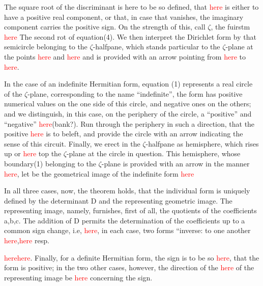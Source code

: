 The square root of the discriminant is here to be so defined, that \textcolor{red}{here} is either to have a positive real component, or that, in case that vanishes, the imaginary component carries the positive sign. On the strength of this, call $\zeta$, the fuirstm \textcolor{red}{here} The second rot of equation(4). We then interpret the Dirichlet form by that semicircle belonging to the $\zeta$-halfpane, which stands particular to the $\zeta$-plane at the points \textcolor{red}{here} and \textcolor{red}{here} and is provided with an arrow pointing from \textcolor{red}{here} to \textcolor{red}{here}.

In the case of an indefinite Hermitian form, equation (1) represents a real circle of the $\zeta$-plane, corresponding to the name “indefinite”, the form has positive numerical values on the one side of this circle, and negative ones on the others; and we distinguish, in this case, on the periphery of the circle, a “positive” and “negative” \textcolor{red}{here}(bank?). Run through the periphery in such a direction, that the positive \textcolor{red}{here} is to beleft, and provide the circle with an arrow indicating the sense of this circuit. Finally, we erect in the $\zeta$-halfpane as hemisphere, which rises up or \textcolor{red}{here} top the $\zeta$-plane at the circle in question. This hemisphere, whose boundary(1) belonging to the $\zeta$-plane is provided with an arrow in the manner \textcolor{red}{here}, let be the geometrical image of the indefinite form \textcolor{red}{here}

In all three cases, now, the theorem holds, that the individual form is uniquely defined by the determinant D and the representing geometric image. The representing image, namely, furnishes, first of all, the quotients of the coefficients a,b,c. The addition of D permits the determination of the coefficients up to a common sign change, i.e, \textcolor{red}{here}, in each case, two forms “inverse: to one another \textcolor{red}{here},\textcolor{red}{here} resp.

 \textcolor{red}{here}\textcolor{red}{here}. Finally, for a definite Hermitian form, the sign is to be so \textcolor{red}{here}, that the form is positive; in the two other cases, however, the direction of the \textcolor{red}{here} of the representing image be \textcolor{red}{here} concerning the sign.

